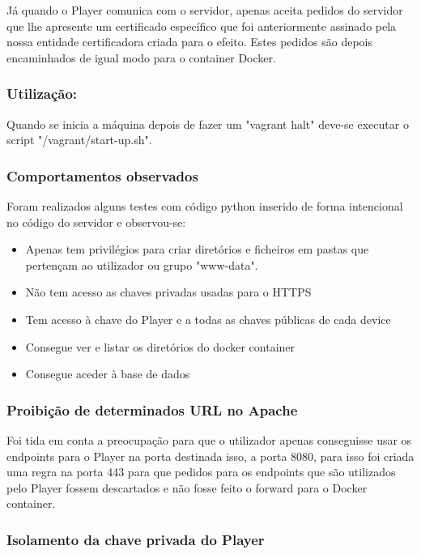 \documentclass[pdftex,12pt,a4paper]{report}
\begin{document}
Já quando o Player comunica com o servidor, apenas aceita pedidos do servidor que lhe apresente um certificado específico que foi anteriormente assinado pela nossa entidade certificadora criada para o efeito. Estes pedidos são depois encaminhados de igual modo para o container Docker.

\subsubsection{Utilização:}
Quando se inicia a máquina depois de fazer um "vagrant halt" deve-se executar o script "/vagrant/start-up.sh". 

\subsubsection{Comportamentos observados}
Foram realizados alguns testes com código python inserido de forma intencional no código do servidor e observou-se:

\begin{itemize}
\item Apenas tem privilégios para criar diretórios e ficheiros em pastas que pertençam ao utilizador ou grupo "www-data".
\item Não tem acesso as chaves privadas usadas para o HTTPS
\item Tem acesso à chave do Player e a todas as chaves públicas de cada device
\item Consegue ver e listar os diretórios do docker container
\item Consegue aceder à base de dados
\end{itemize}

\subsubsection{Proibição de determinados URL no Apache}

Foi tida em conta a preocupação para que o utilizador apenas conseguisse usar os endpoints para o Player na porta destinada isso, a porta 8080, para isso foi criada uma regra na porta 443 para que pedidos para os endpoints que são utilizados pelo Player fossem descartados e não fosse feito o forward para o Docker container.

\subsubsection{Isolamento da chave privada do Player}
\end{document}
